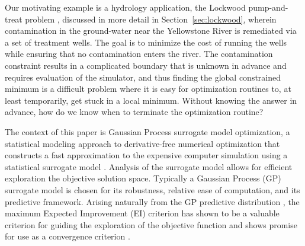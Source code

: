 \documentclass[12pt]{article}
\begin{document}
%
%

%
Our motivating example is a hydrology application, the Lockwood
pump-and-treat problem \citep{lockCite}, discussed in more detail in Section~\ref{sec:lockwood}, wherein contamination in the ground-water near the
Yellowstone River is remediated via a set of treatment wells.  
%
The goal is to minimize the cost of running the wells while ensuring that
no contamination enters the river.  
%
The contamination constraint results in a complicated boundary that is unknown in advance and
requires evaluation of the simulator, and thus finding the global
constrained minimum is a difficult problem where it is easy for
optimization routines to, at least temporarily, get stuck in a local
minimum.  
%
Without knowing the answer in advance, how do we know when
to terminate the optimization routine?


%
%

The context of this paper is Gaussian Process surrogate model
optimization, a statistical modeling approach to derivative-free
numerical optimization that constructs a fast approximation to
the expensive computer simulation using a statistical surrogate model \citep{santnerBook}.
%
Analysis of the surrogate model allows for efficient exploration the objective solution space.  
%
Typically a Gaussian Process (GP) surrogate model is chosen for its
robustness, relative ease of computation, and its predictive framework.
Arising naturally from the GP predictive distribution \citep{gBook}, the maximum Expected Improvement (EI) criterion has shown to be a valuable criterion for guiding the exploration of the objective function and shows promise for use as a convergence criterion \citep{jonesEIOpt, taddyOpt}. %
%
\end{document}
